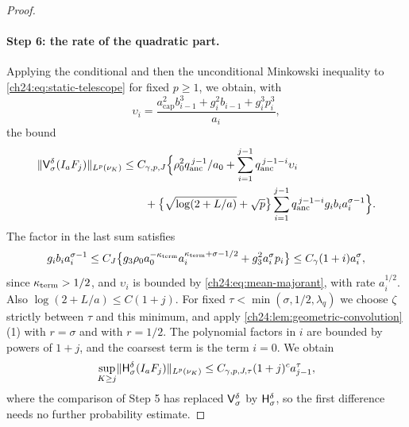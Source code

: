 \begin{proof}
\paragraph{Step 6: the rate of the quadratic part.}
Applying the conditional and then the unconditional Minkowski inequality to \eqref{ch24:eq:static-telescope} for fixed $p\ge1$, we obtain, with
\[
 \upsilon_i=\frac{a_{\mathrm{cap}}^2b_{i-1}^3+g_i^2b_{i-1}+g_i^3p_i^3}{a_i},
\]
the bound
\begin{equation}\label{ch24:eq:static-rate-convolution}
 \begin{split}
 \lVert \mathsf V_{\sigma}^{\delta}(I_aF_j)\rVert_{L^p(\nu_K)}
 &\le C_{\gamma,p,J}\Bigl\{\rho_0^2q_{\mathrm{anc}}^{\,j-1}/a_0+\sum_{i=1}^{j-1}q_{\mathrm{anc}}^{\,j-1-i}\upsilon_i\\
 &\qquad+\bigl\{\sqrt{\log(2+L/a)}+\sqrt p\bigr\}\sum_{i=1}^{j-1}q_{\mathrm{anc}}^{\,j-1-i}g_ib_ia_i^{\sigma-1}\Bigr\}.
 \end{split}
\end{equation}
The factor in the last sum satisfies
\[
 g_ib_ia_i^{\sigma-1}\le C_J\bigl\{g_3\rho_0a_0^{-\kappa_{\mathrm{term}}}a_i^{\kappa_{\mathrm{term}}+\sigma-1/2}+g_3^2a_i^\sigma p_i\bigr\}\le C_\gamma(1+i)a_i^\sigma,
\]
since $\kappa_{\mathrm{term}}>1/2$, and $\upsilon_i$ is bounded by \eqref{ch24:eq:mean-majorant}, with rate $a_i^{1/2}$. Also $\log(2+L/a)\le C(1+j)$. For fixed $\tau<\min(\sigma,1/2,\lambda_q)$ we choose $\zeta$ strictly between $\tau$ and this minimum, and apply \cref{ch24:lem:geometric-convolution}(1) with $r=\sigma$ and with $r=1/2$. The polynomial factors in $i$ are bounded by powers of $1+j$, and the coarsest term is the term $i=0$. We obtain
\begin{equation}\label{ch24:eq:quadratic-smoother-rate}
 \sup_{K\ge j}\lVert \mathsf H_{\sigma}^{\delta}(I_aF_j)\rVert_{L^p(\nu_K)}\le C_{\gamma,p,J,\tau}(1+j)^ca_{j-1}^\tau,
\end{equation}
where the comparison of Step 5 has replaced $\mathsf V_{\sigma}^{\delta}$ by $\mathsf H_{\sigma}^{\delta}$, so the first difference needs no further probability estimate.


\end{proof}
